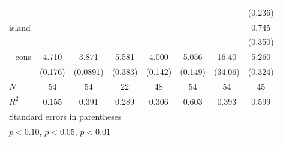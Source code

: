 {\begin{tabular}{l*{7}{c}}
            &                     &                     &                     &                     &                     &                     &     (0.236)         \\
[1em]
island      &                     &                     &                     &                     &                     &                     &       0.745\sym{**} \\
            &                     &                     &                     &                     &                     &                     &     (0.350)         \\
[1em]
\_cons      &       4.710\sym{***}&       3.871\sym{***}&       5.581\sym{***}&       4.000\sym{***}&       5.056\sym{***}&       16.40         &       5.260\sym{***}\\
            &     (0.176)         &    (0.0891)         &     (0.383)         &     (0.142)         &     (0.149)         &     (34.06)         &     (0.324)         \\
\hline
\(N\)       &          54         &          54         &          22         &          48         &          54         &          54         &          45         \\
\(R^{2}\)   &       0.155         &       0.391         &       0.289         &       0.306         &       0.603         &       0.393         &       0.599         \\
\hline\hline
\multicolumn{8}{l}{\footnotesize Standard errors in parentheses}\\
\multicolumn{8}{l}{\footnotesize \sym{*} \(p<0.10\), \sym{**} \(p<0.05\), \sym{***} \(p<0.01\)}\\
\end{tabular}
}
